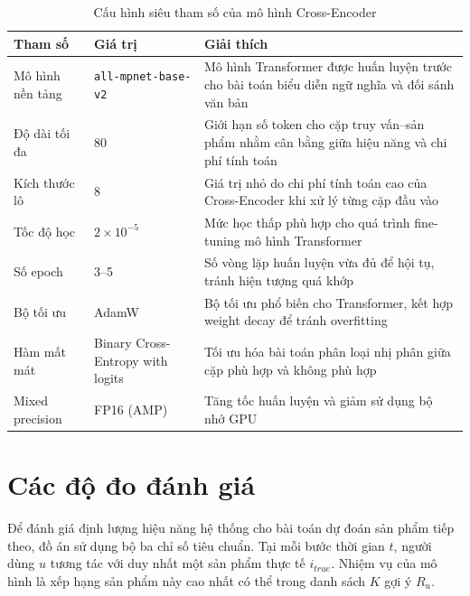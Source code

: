 \begin{table}[H]
    \centering
    \caption{Cấu hình siêu tham số của mô hình Cross-Encoder}
    \label{tab:cross_params}
    \vspace{0.2cm}
    \begin{tabular}{l l p{7cm}}
        \toprule
        \textbf{Tham số} & \textbf{Giá trị} & \textbf{Giải thích} \\
        \midrule
        Mô hình nền tảng & \texttt{all-mpnet-base-v2} & Mô hình Transformer được huấn luyện trước cho bài toán biểu diễn ngữ nghĩa và đối sánh văn bản \\
        
        Độ dài tối đa & 80 & Giới hạn số token cho cặp truy vấn--sản phẩm nhằm cân bằng giữa hiệu năng và chi phí tính toán \\
        
        Kích thước lô & 8 & Giá trị nhỏ do chi phí tính toán cao của Cross-Encoder khi xử lý từng cặp đầu vào \\
        
        Tốc độ học & $2 \times 10^{-5}$ & Mức học thấp phù hợp cho quá trình fine-tuning mô hình Transformer \\
        
        Số epoch & 3--5 & Số vòng lặp huấn luyện vừa đủ để hội tụ, tránh hiện tượng quá khớp \\
        
        Bộ tối ưu & AdamW & Bộ tối ưu phổ biến cho Transformer, kết hợp weight decay để tránh overfitting \\
        
        Hàm mất mát & Binary Cross-Entropy with logits & Tối ưu hóa bài toán phân loại nhị phân giữa cặp phù hợp và không phù hợp \\
        
        Mixed precision & FP16 (AMP) & Tăng tốc huấn luyện và giảm sử dụng bộ nhớ GPU \\
        
        \bottomrule
    \end{tabular}
\end{table}
\section{Các độ đo đánh giá}
\label{sec:metrics}

Để đánh giá định lượng hiệu năng hệ thống cho bài toán dự đoán sản phẩm tiếp theo, đồ án sử dụng bộ ba chỉ số tiêu chuẩn. Tại mỗi bước thời gian $t$, người dùng $u$ tương tác với duy nhất một sản phẩm thực tế $i_{true}$. Nhiệm vụ của mô hình là xếp hạng sản phẩm này cao nhất có thể trong danh sách $K$ gợi ý $R_u$.

